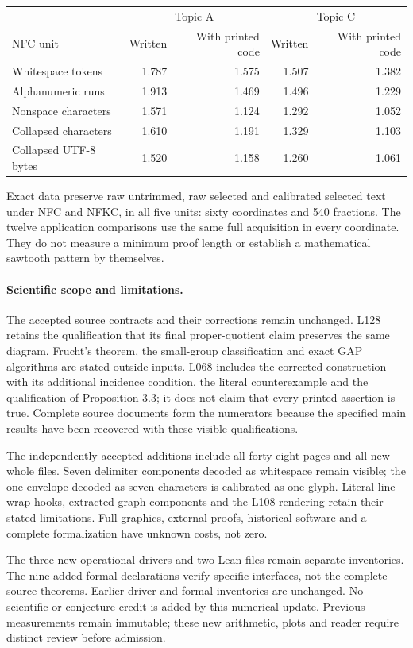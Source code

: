 \documentclass[11pt,a4paper]{article}
\begin{document}
\begin{center}\small\begin{tabular}{lrrrr}\toprule
 & \multicolumn{2}{c}{Topic A} & \multicolumn{2}{c}{Topic C}\\
NFC unit & Written & With printed code & Written & With printed code\\\midrule
Whitespace tokens & 1.787 & 1.575 & 1.507 & 1.382 \\
Alphanumeric runs & 1.913 & 1.469 & 1.496 & 1.229 \\
Nonspace characters & 1.571 & 1.124 & 1.292 & 1.052 \\
Collapsed characters & 1.610 & 1.191 & 1.329 & 1.103 \\
Collapsed UTF-8 bytes & 1.520 & 1.158 & 1.260 & 1.061 \\
\bottomrule\end{tabular}\end{center}
Exact data preserve raw untrimmed, raw selected and calibrated selected text under NFC and NFKC, in all five units: sixty coordinates and 540 fractions. The twelve application comparisons use the same full acquisition in every coordinate. They do not measure a minimum proof length or establish a mathematical sawtooth pattern by themselves.

\paragraph{Scientific scope and limitations.}
The accepted source contracts and their corrections remain unchanged. L128 retains the qualification that its final proper-quotient claim preserves the same diagram. Frucht's theorem, the small-group classification and exact GAP algorithms are stated outside inputs. L068 includes the corrected construction with its additional incidence condition, the literal counterexample and the qualification of Proposition 3.3; it does not claim that every printed assertion is true. Complete source documents form the numerators because the specified main results have been recovered with these visible qualifications.

The independently accepted additions include all forty-eight pages and all new whole files. Seven delimiter components decoded as whitespace remain visible; the one envelope decoded as seven characters is calibrated as one glyph. Literal line-wrap hooks, extracted graph components and the L108 rendering retain their stated limitations. Full graphics, external proofs, historical software and a complete formalization have unknown costs, not zero.

The three new operational drivers and two Lean files remain separate inventories. The nine added formal declarations verify specific interfaces, not the complete source theorems. Earlier driver and formal inventories are unchanged. No scientific or conjecture credit is added by this numerical update. Previous measurements remain immutable; these new arithmetic, plots and reader require distinct review before admission.
\end{document}
